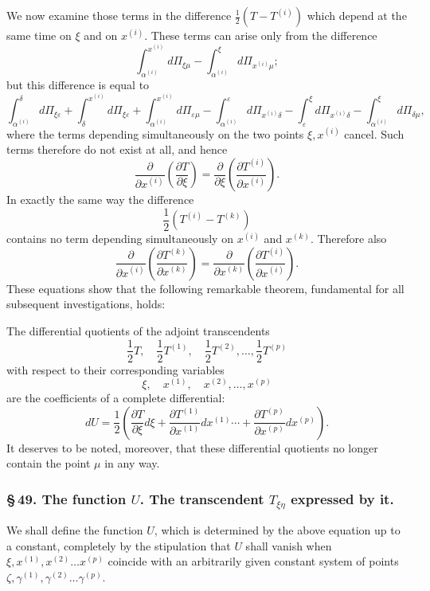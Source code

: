 \documentclass[10pt]{article}
\begin{document}
We now examine those terms in the difference \(\frac12(T-T^{(i)})\) which depend at the same time on \(\xi\) and on \(x^{(i)}\). These terms can arise only from the difference
\[
\int_{\alpha^{(i)}}^{x^{(i)}}d\Pi_{\xi\mu}-\int_{\alpha^{(i)}}^{\xi}d\Pi_{x^{(i)}\mu};
\]
but this difference is equal to
\begingroup\footnotesize
\[
\int_{\alpha^{(i)}}^{\delta}d\Pi_{\xi\varepsilon}
+\int_{\delta}^{x^{(i)}}d\Pi_{\xi\varepsilon}
+\int_{\alpha^{(i)}}^{x^{(i)}}d\Pi_{\varepsilon\mu}
-\int_{\alpha^{(i)}}^{\varepsilon}d\Pi_{x^{(i)}\delta}
-\int_{\varepsilon}^{\xi}d\Pi_{x^{(i)}\delta}
-\int_{\alpha^{(i)}}^{\xi}d\Pi_{\delta\mu},
\]
\endgroup
where the terms depending simultaneously on the two points \(\xi,x^{(i)}\) cancel. Such terms therefore do not exist at all, and hence
\[
\frac{\partial}{\partial x^{(i)}}\left(\frac{\partial T}{\partial\xi}\right)
=\frac{\partial}{\partial\xi}\left(\frac{\partial T^{(i)}}{\partial x^{(i)}}\right).
\]
In exactly the same way the difference
\[
\frac12(T^{(i)}-T^{(k)})
\]
contains no term depending simultaneously on \(x^{(i)}\) and \(x^{(k)}\). Therefore also
\[
\frac{\partial}{\partial x^{(i)}}\left(\frac{\partial T^{(k)}}{\partial x^{(k)}}\right)
=\frac{\partial}{\partial x^{(k)}}\left(\frac{\partial T^{(i)}}{\partial x^{(i)}}\right).
\]
These equations show that the following remarkable theorem, fundamental for all subsequent investigations, holds:

The differential quotients of the adjoint transcendents
\[
\frac12T,\quad \frac12T^{(1)},\quad \frac12T^{(2)},\ldots,\frac12T^{(p)}
\]
with respect to their corresponding variables
\[
\xi,\quad x^{(1)},\quad x^{(2)},\ldots,x^{(p)}
\]
are the coefficients of a complete differential:
\[
dU=\frac12\left(\frac{\partial T}{\partial\xi}d\xi
+\frac{\partial T^{(1)}}{\partial x^{(1)}}dx^{(1)}\cdots
+\frac{\partial T^{(p)}}{\partial x^{(p)}}dx^{(p)}\right).
\]
It deserves to be noted, moreover, that these differential quotients no longer contain the point \(\mu\) in any way.

\subsubsection*{\S\,49. The function \(U\). The transcendent \(T_{\xi\eta}\) expressed by it.}

We shall define the function \(U\), which is determined by the above equation up to a constant, completely by the stipulation that \(U\) shall vanish when \(\xi,x^{(1)},x^{(2)}\ldots x^{(p)}\) coincide with an arbitrarily given constant system of points \(\zeta,\gamma^{(1)},\gamma^{(2)}\ldots\gamma^{(p)}\).
\end{document}
